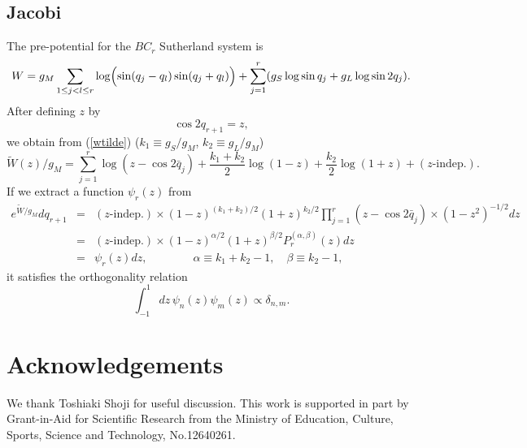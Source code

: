 \documentclass[a4paper,12pt]{article}
\begin{document}
\subsection{Jacobi}

The pre-potential for the $BC_r$ Sutherland system is
\[
   W=g_M\sum_{1\leq j<l\leq r}\log\Bigl(\sin(q_j-q_l)\sin(q_j+q_l)\Bigr)
   +\sum_{j=1}^r(g_S\log\sin q_j+g_L\log\sin 2q_j).
\]
After defining $z$ by
\begin{equation}
   \cos2q_{r+1}=z,
\end{equation}
we obtain from (\ref{wtilde}) ($k_1\equiv g_S/g_M$, $k_2\equiv g_L/g_M$)
\begin{equation}
   \widetilde{W}(z)/g_M =
   \sum_{j=1}^r\log(z-\cos2\bar{q}_j)
   +\frac{k_1+k_2}{2}\log(1-z)+\frac{k_2}{2}\log(1+z)+(\mbox{$z$-indep.}).
\end{equation}
If we extract a function $\psi_{r}(z)$ from
\begin{eqnarray}
   e^{\widetilde{W}/g_M}dq_{r+1}&\!\!=\!\!&(\mbox{$z$-indep.})\times
   (1-z)^{(k_1+k_2)/2}(1+z)^{k_2/2}
   \prod_{j=1}^r(z-\cos 2\bar{q}_j)\times(1-z^2)^{-1/2}dz\nonumber\\
%
   &\!\!=\!\!&(\mbox{$z$-indep.})\times
   (1-z)^{\alpha/2}(1+z)^{\beta/2}P_r^{(\alpha,\beta)}(z)dz
   \nonumber\\
%
   &\!\!=\!\!&\psi_r(z)dz,\qquad\qquad
   \alpha\equiv k_1+k_2-1,\quad \beta\equiv k_2-1,
   \label{psiBCr}
\end{eqnarray}
it satisfies the orthogonality relation
\[
   \int_{-1}^1dz\,\psi_n(z)\psi_m(z)\propto\delta_{n,m}.
\]

\section*{Acknowledgements}
We thank  Toshiaki Shoji for useful discussion.
This work is supported in part by Grant-in-Aid for Scientific Research from
the Ministry of Education, Culture, Sports, Science and Technology,
No.12640261.
\end{document}
